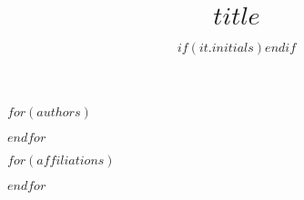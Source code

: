 \documentclass[$if(line_numbers)$
linenumbers,
$endif$
$if(double_spacing)$
doublespacing,
$endif$
$if(two_columns)$
twocolumn,
$endif$]{bmcart}
\begin{document}
\begin{frontmatter}

\begin{fmbox}


\title{$title$}


$for(authors)$
\author[
  addressref={$for(it.affiliation_IDs)$$it$$sep$,$endfor$},
  $if(it.corresponding)$
  corref={$for(it.affiliation_IDs)$$it$$sep$,$endfor$},
  $endif$
  email={$for(it.email)$$it$$sep$,$endfor$}
]{$if(it.initials)$$endif$ }
$endfor$



$for(affiliations)$
\address[id=$it.id$]{
  $if(it.department)$
  ,
  $endif$
  $if(it.affiliation)$
  ,
  $endif$
  $if(it.street)$
  ,
  $endif$
  $if(it.postcode)$
  ,
  $endif$
  $if(it.city)$
  ,
  $endif$
  $if(it.country)$
  $endif$
}
$endfor$


\end{fmbox}
\end{frontmatter}
\end{document}
